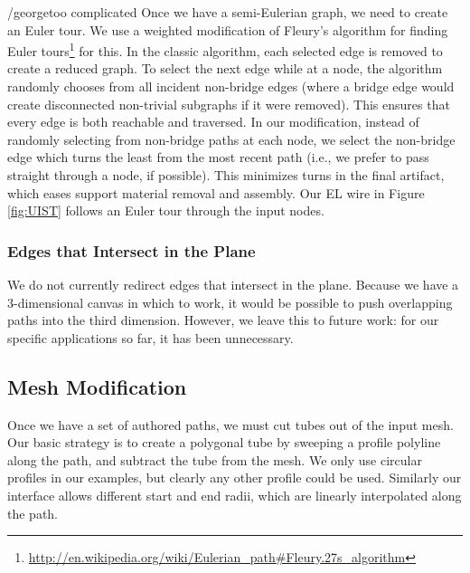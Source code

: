 /george{too complicated}
Once we have a semi-Eulerian graph, we need to create an Euler tour.  We use a weighted modification of Fleury's algorithm for finding Euler tours\footnote{\url{http://en.wikipedia.org/wiki/Eulerian_path\#Fleury.27s_algorithm}} for this.  In the classic algorithm, each selected edge is removed to create a reduced graph.  To select the next edge while at a node, the algorithm randomly chooses from all incident non-bridge edges (where a bridge edge would create disconnected non-trivial subgraphs if it were removed).  This ensures that every edge is both reachable and traversed.  In our modification, instead of randomly selecting from non-bridge paths at each node, we select the non-bridge edge which turns the least from the most recent path (i.e., we prefer to pass straight through a node, if possible).  This minimizes turns in the final artifact, which eases support material removal and assembly.  Our EL wire in Figure \ref{fig:UIST} follows an Euler tour through the input nodes.

\subsubsection{Edges that Intersect in the Plane}
We do not currently redirect edges that intersect in the plane.  Because we have a 3-dimensional canvas in which to work, it would be possible to push overlapping paths into the third dimension.  However, we leave this to future work: for our specific applications so far, it has been unnecessary.

\subsection{Mesh Modification}
Once we have a set of authored paths, we must cut tubes out of the input mesh.
Our basic strategy is to create a polygonal tube by sweeping a profile polyline
along the path, and subtract the tube from the mesh. We only use circular profiles
in our examples, but clearly any other profile could be used. Similarly our interface
allows different start and end radii, which are linearly interpolated along the path.

